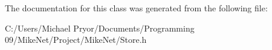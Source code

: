 The documentation for this class was generated from the following file:\begin{DoxyCompactItemize}
\item 
C:/Users/Michael Pryor/Documents/Programming 09/MikeNet/Project/MikeNet/Store.h\end{DoxyCompactItemize}
